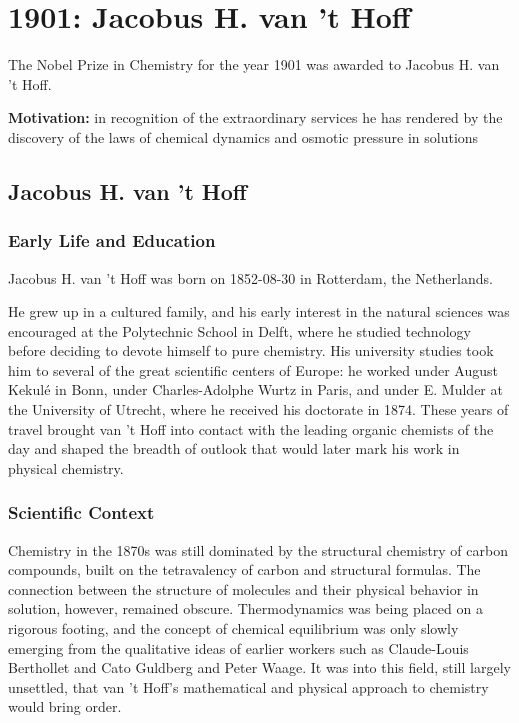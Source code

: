 \chapter{1901: Jacobus H. van 't Hoff}
\label{chap:chemistry1901}

The Nobel Prize in Chemistry for the year 1901 was awarded to Jacobus H. van 't Hoff.

\textbf{Motivation:}
in recognition of the extraordinary services he has rendered by the discovery of the laws of chemical dynamics and osmotic pressure in solutions

\section{Jacobus H. van 't Hoff}

\subsection*{Early Life and Education}

Jacobus H. van 't Hoff was born on 1852-08-30 in Rotterdam, the Netherlands.

He grew up in a cultured family, and his early interest in the natural sciences was encouraged at the Polytechnic School in Delft, where he studied technology before deciding to devote himself to pure chemistry. His university studies took him to several of the great scientific centers of Europe: he worked under August Kekulé in Bonn, under Charles-Adolphe Wurtz in Paris, and under E. Mulder at the University of Utrecht, where he received his doctorate in 1874. These years of travel brought van 't Hoff into contact with the leading organic chemists of the day and shaped the breadth of outlook that would later mark his work in physical chemistry.

\subsection*{Scientific Context}

Chemistry in the 1870s was still dominated by the structural chemistry of carbon compounds, built on the tetravalency of carbon and structural formulas. The connection between the structure of molecules and their physical behavior in solution, however, remained obscure. Thermodynamics was being placed on a rigorous footing, and the concept of chemical equilibrium was only slowly emerging from the qualitative ideas of earlier workers such as Claude-Louis Berthollet and Cato Guldberg and Peter Waage. It was into this field, still largely unsettled, that van 't Hoff's mathematical and physical approach to chemistry would bring order.

